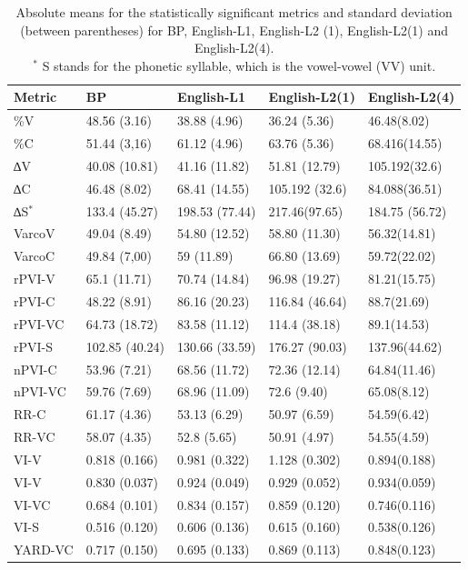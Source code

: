 \begin{table}
\caption{Absolute means for the statistically significant metrics and standard
deviation (between parentheses) for BP, English-L1, English-L2 (1),
English-L2(1) and English-L2(4).\\$^\ast$ S stands for the phonetic syllable, which is the  vowel-vowel (VV) unit.}\label{leo-tab03}
\begin{tabular}{@{}lllll@{}}
\toprule
Metric & BP & English-L1 & English-L2(1) & English-L2(4) \\
\midrule
\%V & 48.56 (3.16) & 38.88 (4.96) & 36.24 (5.36) & 46.48(8.02) \\
\%C & 51.44 (3,16) & 61.12 (4.96) & 63.76 (5.36) & 68.416(14.55) \\
∆V & 40.08 (10.81) & 41.16 (11.82) & 51.81 (12.79) & 105.192(32.6) \\
∆C & 46.48 (8.02) & 68.41 (14.55) & 105.192 (32.6) & 84.088(36.51) \\
∆S$^\ast$ & 133.4 (45.27) & 198.53 (77.44) & 217.46(97.65) & 184.75 (56.72) \\
VarcoV & 49.04 (8.49) & 54.80 (12.52) & 58.80 (11.30) & 56.32(14.81) \\
VarcoC & 49.84 (7,00) & 59 (11.89) & 66.80 (13.69) & 59.72(22.02) \\
rPVI-V & 65.1 (11.71) & 70.74 (14.84) & 96.98 (19.27) & 81.21(15.75) \\
rPVI-C & 48.22 (8.91) & 86.16 (20.23) & 116.84 (46.64) & 88.7(21.69) \\
rPVI-VC & 64.73 (18.72) & 83.58 (11.12) & 114.4 (38.18) & 89.1(14.53) \\
rPVI-S & 102.85 (40.24) & 130.66 (33.59) & 176.27 (90.03) & 137.96(44.62) \\
nPVI-C & 53.96 (7.21) & 68.56 (11.72) & 72.36 (12.14) & 64.84(11.46) \\
nPVI-VC & 59.76 (7.69) & 68.96 (11.09) & 72.6 (9.40) & 65.08(8.12) \\
RR-C & 61.17 (4.36) & 53.13 (6.29) & 50.97 (6.59) & 54.59(6.42) \\
RR-VC & 58.07 (4.35) & 52.8 (5.65) & 50.91 (4.97) & 54.55(4.59) \\
VI-V & 0.818 (0.166) & 0.981 (0.322) & 1.128 (0.302) & 0.894(0.188) \\
VI-V & 0.830 (0.037) & 0.924 (0.049) & 0.929 (0.052) & 0.934(0.059) \\
VI-VC & 0.684 (0.101) & 0.834 (0.157) & 0.859 (0.120) & 0.746(0.116) \\
VI-S & 0.516 (0.120) & 0.606 (0.136) & 0.615 (0.160) & 0.538(0.126) \\
YARD-VC & 0.717 (0.150) & 0.695 (0.133) & 0.869 (0.113) & 0.848(0.123) \\
\bottomrule
\end{tabular}
\end{table}

